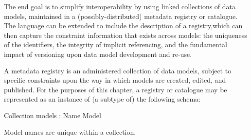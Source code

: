 \documentclass{article}
\begin{document}
		The end goal is to simplify interoperability by using linked collections of data models, maintained in a (possibly-distributed) metadata registry or catalogue.  The language can be extended to include the description of a registry,which can then capture the constraint information that exists across models: the uniqueness of the identifiers, the integrity of implicit referencing, and the fundamental impact of versioning upon data model development and re-use.
		
		A metadata registry is an administered collection of data models, subject to specific constraints upon the way in which models are created, edited, and published.  For the purposes of this chapter, a registry or catalogue may be represented as an instance of (a subtype of) the following schema:
		\begin{schema}{Collection}
			models : Name \pfun Model
		\end{schema}
		Model names are unique within a collection. 
	
{\small
	}
\end{document}
